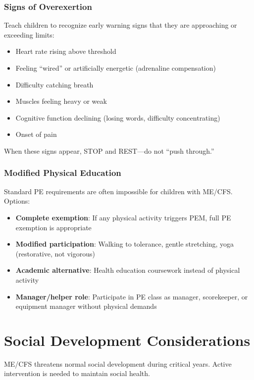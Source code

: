 \subsubsection{Signs of Overexertion}

Teach children to recognize early warning signs that they are approaching or exceeding limits:

\begin{itemize}
    \item Heart rate rising above threshold
    \item Feeling ``wired'' or artificially energetic (adrenaline compensation)
    \item Difficulty catching breath
    \item Muscles feeling heavy or weak
    \item Cognitive function declining (losing words, difficulty concentrating)
    \item Onset of pain
\end{itemize}

When these signs appear, STOP and REST---do not ``push through.''

\subsubsection{Modified Physical Education}

Standard PE requirements are often impossible for children with ME/CFS. Options:

\begin{itemize}
    \item \textbf{Complete exemption}: If any physical activity triggers PEM, full PE exemption is appropriate
    \item \textbf{Modified participation}: Walking to tolerance, gentle stretching, yoga (restorative, not vigorous)
    \item \textbf{Academic alternative}: Health education coursework instead of physical activity
    \item \textbf{Manager/helper role}: Participate in PE class as manager, scorekeeper, or equipment manager without physical demands
\end{itemize}

\section{Social Development Considerations}
\label{sec:ped-social-development}

ME/CFS threatens normal social development during critical years. Active intervention is needed to maintain social health.

